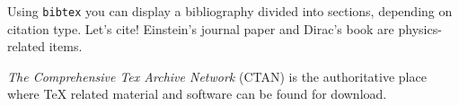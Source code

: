 \documentclass[12pt]{article}
\begin{document}
Using \texttt{bibtex} you can display a bibliography divided
into sections, depending on citation type. Let's cite! Einstein's
journal paper \cite{einstein} and Dirac's book \cite{dirac} are
physics-related items.


\textit{The Comprehensive Tex Archive Network} (CTAN)
\cite{ctan} is the authoritative place where TeX related material and software can be found for download.






\blindtext
\end{document}

